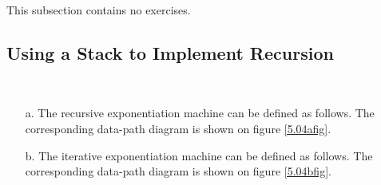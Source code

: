 This subsection contains no exercises.

\subsection{Using a Stack to Implement Recursion}

\begin{exe}[5.4]
    \label{5.04}
    \ \vspace{-20pt}
    \begin{itemize}
        \item[a.] The recursive exponentiation machine can be defined as 
            follows. The corresponding data-path diagram is shown on figure 
            \ref{5.04afig}.
        \item[b.] The iterative exponentiation machine can be defined as 
            follows. The corresponding data-path diagram is shown on figure 
            \ref{5.04bfig}.
    \end{itemize}

    \begin{figure}
        \centering
\end{figure}
\end{exe}
